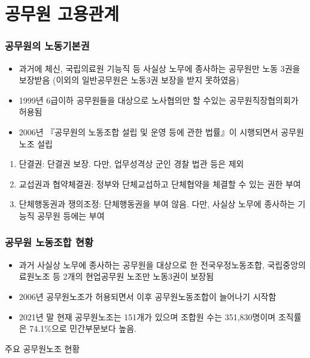 \documentclass[aspectratio=169,xcolor=dvipsnames,handout]{beamer}
\begin{document}
\section{공무원 고용관계}
\begin{frame}[allowframebreaks]
    \frametitle{공무원의 노동기본권}
    \begin{itemize}[<+->]
        \item 과거에 체신, 국립의료원 기능직 등 사실상 노무에 종사하는 공무원만 노동 3권을 보장받음 (이외의 일반공무원은 노동3권 보장을 받지 못하였음)
        \item 1999년 6급이하 공무원들을 대상으로 노사협의만 할 수있는 공무원직장협의회가 허용됨
        \item 2006년 『공무원의 노동조합 설립 및 운영 등에 관한 법률』이 시행되면서 공무원노조 설립
    \end{itemize}
\framebreak%
    \begin{enumerate}
        \item 단결권: 단결권 보장. 다만, 업무성격상 군인 경찰 법관 등은 제외
        \item 교섭권과 협약체결권: 정부와 단체교섭하고 단체협약을 체결할 수 있는 권한 부여
        \item 단체행동권과 쟁의조정: 단체행동권을 부여 않음. 다만, 사실상 노무에 종사하는 기능직 공무원 등에는 부여
    \end{enumerate}
\end{frame}

\begin{frame}[allowframebreaks]
    \frametitle{공무원 노동조합 현황}
    \begin{itemize}[<+->]
        \item 과거 사실상 노무에 종사하는 공무원을 대상으로 한 전국우정노동조합, 국립중앙의료원노조 등 2개의 현업공무원 노조만 노동3권이 보장됨
        \item 2006년 공무원노조가 허용되면서 이후 공무원노동조합이 늘어나기 시작함
        \item 2021년 말 현재 공무원노조는 151개가 있으며 조합원 수는 351,830명이며 조직률은 74.1\%으로 민간부문보다 높음. 
    \end{itemize}
    \begin{table}
        \centering
        \resizebox{.65\textwidth}{!}{\relax
            
        }
        \caption{주요 공무원노조 현황}
    \end{table}
\end{frame}
\end{document}
